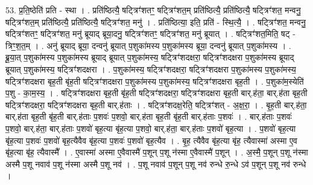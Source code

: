 \documentclass[17pt]{extarticle}
\begin{document}
53. प्र॒ति॒ष्ठेति॑ प्रति - स्था । . प्रति॑ष्ठित्यै॒ षट्त्रिꣳ॑शतꣳ॒॒ षट्त्रिꣳ॑शत॒म् प्रति॑ष्ठित्यै॒ प्रति॑ष्ठित्यै॒ षट्त्रिꣳ॑शत॒ मन्वनु॒ षट्त्रिꣳ॑शत॒म् प्रति॑ष्ठित्यै॒ प्रति॑ष्ठित्यै॒ षट्त्रिꣳ॑शत॒ मनु॑ । . प्रति॑ष्ठित्या॒ इति॒ प्रति॑ - स्थि॒त्यै॒ । . षट्त्रिꣳ॑शत॒ मन्वनु॒ षट्त्रिꣳ॑शतꣳ॒॒ षट्त्रिꣳ॑शत॒ मनु॑ ब्रूयाद् ब्रूया॒दनु॒ षट्त्रिꣳ॑शतꣳ॒॒ षट्त्रिꣳ॑शत॒ मनु॑ ब्रूयात् । . षट्त्रिꣳ॑शत॒मिति॒ षट् - त्रिꣳ॒॒श॒त॒म् । . अनु॑ ब्रूयाद् ब्रूया॒ दन्वनु॑ ब्रूयात् प॒शुका॑मस्य प॒शुका॑मस्य ब्रूया॒ दन्वनु॑ ब्रूयात् प॒शुका॑मस्य । . ब्रू॒या॒त् प॒शुका॑मस्य प॒शुका॑मस्य ब्रूयाद् ब्रूयात् प॒शुका॑मस्य॒ षट्त्रिꣳ॑शदक्षरा॒ षट्त्रिꣳ॑शदक्षरा प॒शुका॑मस्य ब्रूयाद् ब्रूयात् प॒शुका॑मस्य॒ षट्त्रिꣳ॑शदक्षरा । . प॒शुका॑मस्य॒ षट्त्रिꣳ॑शदक्षरा॒ षट्त्रिꣳ॑शदक्षरा प॒शुका॑मस्य प॒शुका॑मस्य॒ षट्त्रिꣳ॑शदक्षरा बृह॒ती बृ॑ह॒ती षट्त्रिꣳ॑शदक्षरा प॒शुका॑मस्य प॒शुका॑मस्य॒ षट्त्रिꣳ॑शदक्षरा बृह॒ती । . प॒शुका॑म॒स्येति॑ प॒शु - का॒म॒स्य॒ । . षट्त्रिꣳ॑शदक्षरा बृह॒ती बृ॑ह॒ती षट्त्रिꣳ॑शदक्षरा॒ षट्त्रिꣳ॑शदक्षरा बृह॒ती बार्.ह॑ता॒ बार्.ह॑ता बृह॒ती षट्त्रिꣳ॑शदक्षरा॒ षट्त्रिꣳ॑शदक्षरा बृह॒ती बार्.ह॑ताः । . षट्त्रिꣳ॑शदक्ष॒रेति॒ षट्त्रिꣳ॑शत् - अ॒क्ष॒रा॒ । . बृ॒ह॒ती बार्.ह॑ता॒ बार्.ह॑ता बृह॒ती बृ॑ह॒ती बार्.ह॑ताः प॒शवः॑ प॒शवो॒ बार्.ह॑ता बृह॒ती बृ॑ह॒ती बार्.ह॑ताः प॒शवः॑ । . बार्.ह॑ताः प॒शवः॑ प॒शवो॒ बार्.ह॑ता॒ बार्.ह॑ताः प॒शवो॑ बृह॒त्या बृ॑ह॒त्या प॒शवो॒ बार्.ह॑ता॒ बार्.ह॑ताः प॒शवो॑ बृह॒त्या । . प॒शवो॑ बृह॒त्या बृ॑ह॒त्या प॒शवः॑ प॒शवो॑ बृह॒त्यैवैव बृ॑ह॒त्या प॒शवः॑ प॒शवो॑ बृह॒त्यैव । . बृ॒ह॒ त्यैवैव बृ॑ह॒त्या बृ॑ह॒ त्यैवास्मा॑ अस्मा ए॒व बृ॑ह॒त्या बृ॑ह॒ त्यैवास्मै᳚ । . ए॒वास्मा॑ अस्मा ए॒वैवास्मै॑ प॒शून् प॒शू न॑स्मा ए॒वैवास्मै॑ प॒शून् । . अ॒स्मै॒ प॒शून् प॒शू न॑स्मा अस्मै प॒शू नवाव॑ प॒शू न॑स्मा अस्मै प॒शू नव॑ । . प॒शू नवाव॑ प॒शून् प॒शू नव॑ रुन्धे रु॒न्धे ऽव॑ प॒शून् प॒शू नव॑ रुन्धे । \newline
\pagebreak
{}
\end{document}

